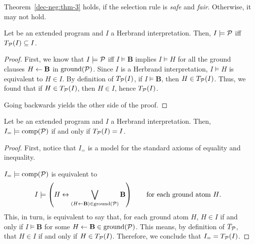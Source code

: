 \begin{rem}
    Theorem~\ref{dec-neg:thm-3} holds, if the selection rule is \emph{safe} and \emph{fair}. Otherwise, it may not hold.
\end{rem}

\begin{lem}
    Let \prog be an extended program and \(I\) a Herbrand interpretation.
    Then, \(I \models \mathcal{P}\) iff \(T_\mathcal{P}(I) \subseteq I\).
\end{lem}
\begin{proof}
    First, we know that \(I \models \mathcal{P}\) iff \(I \models \mathbf{B}\) implies \(I \models H\) for all the ground clauses \(H \leftarrow \mathbf{B}\) in \(\operatorname{ground}(\mathcal{P})\).
    Since \(I\) is a Herbrand interpretation, \(I \models H\) is equivalent to \(H \in I\).
    By definition of \(T_\mathcal{P}(I)\), if \(I \models \mathbf{B}\), then \(H \in T_\mathcal{P}(I)\).
    Thus, we found that if \(H \in T_\mathcal{P}(I)\), then \(H \in I\), hence \(T_\mathcal{P}(I)\).

    Going backwards yields the other side of the proof.
\end{proof}

\begin{lem}
    \label{lem:decl-neg-supp}
    Let \prog be an extended program and \(I\) a Herbrand interpretation. Then, \(I_= \models \operatorname{comp}(\mathcal{P})\) if and only if \(T_\mathcal{P}(I) = I\).
\end{lem}
\begin{proof}
    First, notice that \(I_=\) is a model for the standard axioms of equality and inequality.

    \(I_= \models \operatorname{comp}(\mathcal{P})\) is equivalent to
    \begin{equation*}
        I \models \left(H \leftrightarrow \bigvee_{(H \leftarrow \mathbf{B}) \in \operatorname{ground}(\mathcal{P})} \mathbf{B}\right) \qquad \text{for each ground atom \(H\).}
    \end{equation*}
    This, in turn, is equivalent to say that, for each ground atom \(H\), \(H \in I\) if and only if \(I \models \mathbf{B}\) for some \(H \leftarrow \mathbf{B} \in \operatorname{ground}(\mathcal{P})\).
    This means, by definition of \(T_\mathcal{P}\), that \(H \in I\) if and only if \(H \in T_\mathcal{P}(I)\).
    Therefore, we conclude that \(I_= = T_\mathcal{P}(I)\).
\end{proof}

